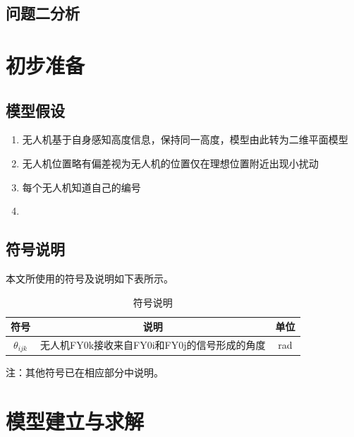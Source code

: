 \documentclass[UTF-8,a4paper,zihao=-4]{ctexart}
\begin{document}
\subsection{问题二分析}


\section{初步准备}
\subsection{模型假设}
\begin{enumerate}
    \item 无人机基于自身感知高度信息，保持同一高度，模型由此转为二维平面模型
    \item 无人机位置略有偏差视为无人机的位置仅在理想位置附近出现小扰动
    \item 每个无人机知道自己的编号
    \item 
    
\end{enumerate}

\subsection{符号说明}
本文所使用的符号及说明如下表所示。
\begin{table}[H]
\centering
{}

\caption{符号说明}
\begin{tabular}{ccc}
\toprule
符号 & 说明 & 单位 \\
\midrule
$\theta_{ijk}$ & 无人机FY0k接收来自FY0i和FY0j的信号形成的角度 & rad \\
\bottomrule
\end{tabular}

\vspace{0.5em}
\parbox{0.9\textwidth}{
注：其他符号已在相应部分中说明。
}
\end{table}

\section{模型建立与求解}
\end{document}
